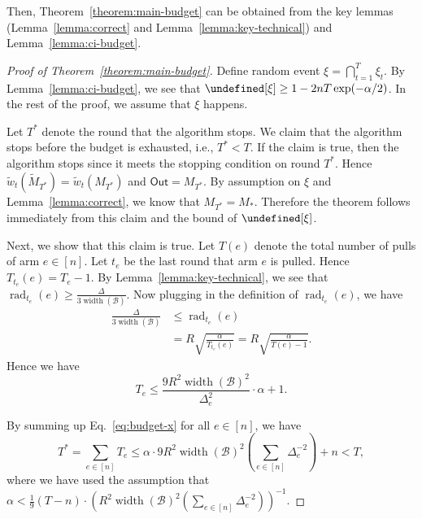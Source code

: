\documentclass{article}
\newcommand{\B}{\mathcal B}
\DeclareMathOperator{\rank}{width}
\DeclareMathOperator{\rad}{rad}
\newcommand{\out}{\mathsf{Out}}
\let\Pr\undefined
\DeclareMathOperator{\Pr}{Pr}
\begin{document}
Then, Theorem~\ref{theorem:main-budget} can be obtained from the key lemmas (Lemma~\ref{lemma:correct} and Lemma~\ref{lemma:key-technical}) and Lemma~\ref{lemma:ci-budget}.
\begin{proof}[Proof of Theorem~\ref{theorem:main-budget}]
Define random event $\xi=\bigcap_{t=1}^T \xi_t$. 
By Lemma~\ref{lemma:ci-budget}, we see that $\Pr[\xi] \ge 1-2nT\exp(-\alpha/2)$.
In the rest of the proof, we assume that $\xi$ happens.

Let $T^*$ denote the round that the algorithm stops.
We claim that the algorithm stops before the budget is exhausted, i.e., $T^* < T$.
If the claim is true, then the algorithm stops since it meets the stopping condition on round $T^*$.
Hence $\tilde w_t(\tilde M_{T^*}) = \tilde w_t(M_{T^*})$ and $\out = M_{T^*}$.
By assumption on $\xi$ and Lemma~\ref{lemma:correct}, we know that $M_{T^*} = M_*$.
Therefore the theorem follows immediately from this claim and the bound of $\Pr[\xi]$.

Next, we show that this claim is true.
Let $T(e)$ denote the total number of pulls of arm $e\in[n]$.
Let $t_e$ be the last round that arm $e$ is pulled.
Hence $T_{t_e}(e) = T_e-1$.
By Lemma~\ref{lemma:key-technical}, we see that $\rad_{t_e}(e) \ge \frac{\Delta}{3\rank(\B)}$.
Now plugging in the definition of $\rad_{t_e}(e)$, we have
\begin{align*}
	\frac{\Delta}{3\rank(\B)} &\le \rad_{t_e}(e) \\
										        &= R\sqrt{\frac{\alpha}{T_{t_e}(e)}} = R\sqrt{\frac{\alpha}{T(e) -1}}.
\end{align*}
Hence we have
\begin{equation}
\label{eq:budget-x}
T_e \le \frac{9R^2\rank(\B)^2}{\Delta_e^2}\cdot\alpha+1.
\end{equation}

By summing up Eq.~\eqref{eq:budget-x} for all $e\in [n]$, we have
$$
T^* = \sum_{e\in [n]} T_e \le \alpha \cdot 9R^2\rank(\B)^2 \left(\sum_{e\in[n]}\Delta_e^{-2}\right)+n < T,
$$
where we have used the assumption that $\alpha < \frac{1}9 (T-n) \cdot \left(R^2\rank(\B)^2 \left(\sum_{e\in[n]}\Delta_e^{-2}\right)\right)^{-1}.$

\end{proof}
\end{document}
